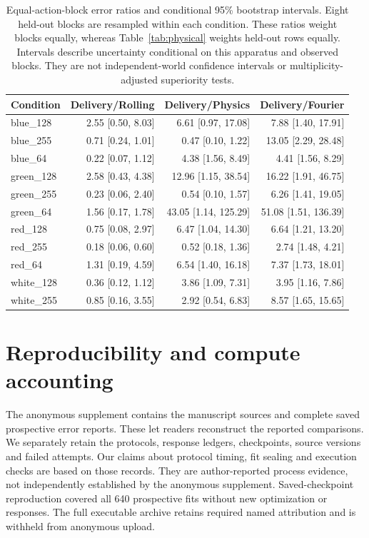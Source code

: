 \begin{table}[ht]
\centering\small
\begin{tabular}{lrrr}
\toprule
Condition & Delivery/Rolling & Delivery/Physics & Delivery/Fourier\\
\midrule
blue\_128 & 2.55 [0.50, 8.03] & 6.61 [0.97, 17.08] & 7.88 [1.40, 17.91]\\
blue\_255 & 0.71 [0.24, 1.01] & 0.47 [0.10, 1.22] & 13.05 [2.29, 28.48]\\
blue\_64 & 0.22 [0.07, 1.12] & 4.38 [1.56, 8.49] & 4.41 [1.56, 8.29]\\
green\_128 & 2.58 [0.43, 4.38] & 12.96 [1.15, 38.54] & 16.22 [1.91, 46.75]\\
green\_255 & 0.23 [0.06, 2.40] & 0.54 [0.10, 1.57] & 6.26 [1.41, 19.05]\\
green\_64 & 1.56 [0.17, 1.78] & 43.05 [1.14, 125.29] & 51.08 [1.51, 136.39]\\
red\_128 & 0.75 [0.08, 2.97] & 6.47 [1.04, 14.30] & 6.64 [1.21, 13.20]\\
red\_255 & 0.18 [0.06, 0.60] & 0.52 [0.18, 1.36] & 2.74 [1.48, 4.21]\\
red\_64 & 1.31 [0.19, 4.59] & 6.54 [1.40, 16.18] & 7.37 [1.73, 18.01]\\
white\_128 & 0.36 [0.12, 1.12] & 3.86 [1.09, 7.31] & 3.95 [1.16, 7.86]\\
white\_255 & 0.85 [0.16, 3.55] & 2.92 [0.54, 6.83] & 8.57 [1.65, 15.65]\\
\bottomrule
\end{tabular}
\caption{Equal-action-block error ratios and conditional 95\% bootstrap intervals. Eight held-out blocks are resampled within each condition. These ratios weight blocks equally, whereas Table~\ref{tab:physical} weights held-out rows equally. Intervals describe uncertainty conditional on this apparatus and observed blocks. They are not independent-world confidence intervals or multiplicity-adjusted superiority tests.}
\label{tab:physical-ci}
\end{table}



\section{Reproducibility and compute accounting}
\label{sec:reproducibility}
The anonymous supplement contains the manuscript sources and complete saved
prospective error reports. These let readers reconstruct the reported
comparisons. We separately retain the protocols, response ledgers, checkpoints,
source versions and failed attempts. Our claims about protocol timing, fit
sealing and execution checks are based on those records. They are author-reported
process evidence, not independently established by the anonymous supplement.
Saved-checkpoint reproduction covered all 640 prospective fits without new
optimization or responses. The full executable archive retains required named
attribution and is withheld from anonymous upload.

